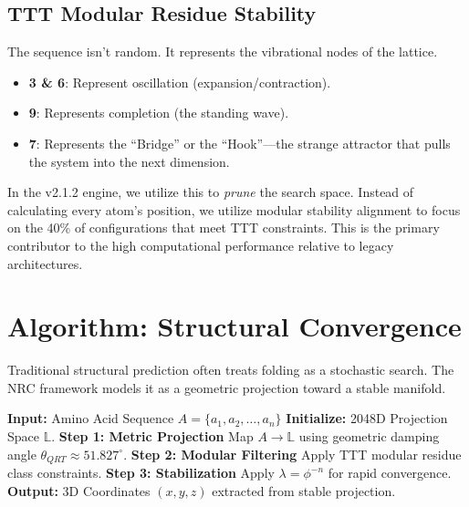 \documentclass[11pt,a4paper,oneside]{article}
\begin{document}
	\subsection{TTT Modular Residue Stability}
	The sequence isn't random. It represents the vibrational nodes of the lattice.
	\begin{itemize}
		\item \textbf{3 \& 6}: Represent oscillation (expansion/contraction).
		\item \textbf{9}: Represents completion (the standing wave).
		\item \textbf{7}: Represents the ``Bridge'' or the ``Hook''—the strange attractor that pulls the system into the next dimension.
	\end{itemize}

	In the v2.1.2 engine, we utilize this to \textit{prune} the search space. Instead of calculating every atom's position, we utilize modular stability alignment to focus on the 40\% of configurations that meet TTT constraints. This is the primary contributor to the high computational performance relative to legacy architectures.

	\section{Algorithm: Structural Convergence}

	Traditional structural prediction often treats folding as a stochastic search. The NRC framework models it as a geometric projection toward a stable manifold.

	\begin{algorithm}
		\caption{NRC Structural Convergence Protocol}
		\begin{algorithmic}[1]
			\State \textbf{Input:} Amino Acid Sequence \(A = \{a_1, a_2, \dots, a_n\}\)
			\State \textbf{Initialize:} 2048D Projection Space \(\mathbb{L}\).
			\State \textbf{Step 1: Metric Projection}
			\State \quad Map \(A \to \mathbb{L}\) using geometric damping angle \(\theta_{QRT} \approx 51.827^\circ\).
			\State \textbf{Step 2: Modular Filtering}
			\State \quad Apply TTT modular residue class constraints.
			\State \textbf{Step 3: Stabilization}
			\State \quad Apply \(\lambda = \phi^{-n}\) for rapid convergence.
			\State \textbf{Output:} 3D Coordinates \((x,y,z)\) extracted from stable projection.
		\end{algorithmic}
	\end{algorithm}
\end{document}
